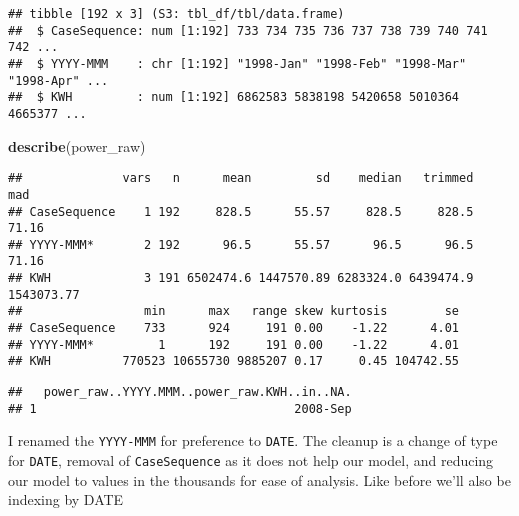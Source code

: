 \documentclass[
]{article}
\newenvironment{Shaded}{\begin{snugshade}}{\end{snugshade}}
\newcommand{\AttributeTok}[1]{\textcolor[rgb]{0.13,0.29,0.53}{#1}}
\newcommand{\ConstantTok}[1]{\textcolor[rgb]{0.56,0.35,0.01}{#1}}
\newcommand{\FunctionTok}[1]{\textcolor[rgb]{0.13,0.29,0.53}{\textbf{#1}}}
\newcommand{\NormalTok}[1]{#1}
\newcommand{\SpecialCharTok}[1]{\textcolor[rgb]{0.81,0.36,0.00}{\textbf{#1}}}
\newcommand{\StringTok}[1]{\textcolor[rgb]{0.31,0.60,0.02}{#1}}
\begin{document}
\begin{verbatim}
## tibble [192 x 3] (S3: tbl_df/tbl/data.frame)
##  $ CaseSequence: num [1:192] 733 734 735 736 737 738 739 740 741 742 ...
##  $ YYYY-MMM    : chr [1:192] "1998-Jan" "1998-Feb" "1998-Mar" "1998-Apr" ...
##  $ KWH         : num [1:192] 6862583 5838198 5420658 5010364 4665377 ...
\end{verbatim}

\begin{Shaded}
\begin{Highlighting}[]
\FunctionTok{describe}\NormalTok{(power\_raw)}
\end{Highlighting}
\end{Shaded}

\begin{verbatim}
##              vars   n      mean         sd    median   trimmed        mad
## CaseSequence    1 192     828.5      55.57     828.5     828.5      71.16
## YYYY-MMM*       2 192      96.5      55.57      96.5      96.5      71.16
## KWH             3 191 6502474.6 1447570.89 6283324.0 6439474.9 1543073.77
##                 min      max   range skew kurtosis        se
## CaseSequence    733      924     191 0.00    -1.22      4.01
## YYYY-MMM*         1      192     191 0.00    -1.22      4.01
## KWH          770523 10655730 9885207 0.17     0.45 104742.55
\end{verbatim}

\begin{Shaded}
\end{Shaded}

\begin{verbatim}
##   power_raw..YYYY.MMM..power_raw.KWH..in..NA.
## 1                                    2008-Sep
\end{verbatim}

I renamed the \texttt{YYYY-MMM} for preference to \texttt{DATE}. The
cleanup is a change of type for \texttt{DATE}, removal of
\texttt{CaseSequence} as it does not help our model, and reducing our
model to values in the thousands for ease of analysis. Like before we'll
also be indexing by DATE
\end{document}
